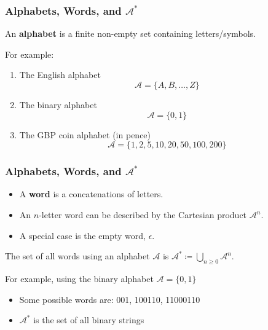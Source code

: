 \documentclass[hyperref={pdfpagemode=UseThumbs, pdfpagelayout=SinglePage, bookmarks=true, },handout,xcolor=dvipsnames]{beamer}
\newcommand{\alphabet}{\mathcal{A}}
\begin{document}
\begin{frame}
\frametitle{Alphabets, Words, and $\alphabet^*$}
\begin{definition}
    An \textbf{alphabet} is a finite non-empty set containing letters/symbols.
\end{definition}
For example:
\begin{enumerate}
    \item
    The English alphabet
    $$\alphabet = \{A,B,\dots,Z\}$$

    \item
    The binary alphabet
    $$\alphabet = \{0,1\}$$

    \item
    The GBP coin alphabet (in pence)
    $$\alphabet = \{1,2,5,10,20,50,100,200\}$$
\end{enumerate}
\end{frame}
\begin{frame}
\frametitle{Alphabets, Words, and $\alphabet^*$}
\begin{definition}
    \begin{itemize}
        \item
        A \textbf{word} is a concatenations of letters.
        \item
        An $n$-letter word can be described by the Cartesian product $\alphabet^n$.
        \item
        A special case is the empty word, $\epsilon$.
    \end{itemize}
\end{definition}
\begin{definition}
    The set of all words using an alphabet $\alphabet$ is $\alphabet^* \coloneqq \bigcup\limits_{n \geq 0} \alphabet^n$.
\end{definition}
For example, using the binary alphabet $\alphabet = \{0,1\}$ \\
\begin{itemize}
    \item
    Some possible words are: 001, 100110, 11000110
    \item
    $\alphabet^*$ is the set of all binary strings
\end{itemize}
\end{frame}
\end{document}
